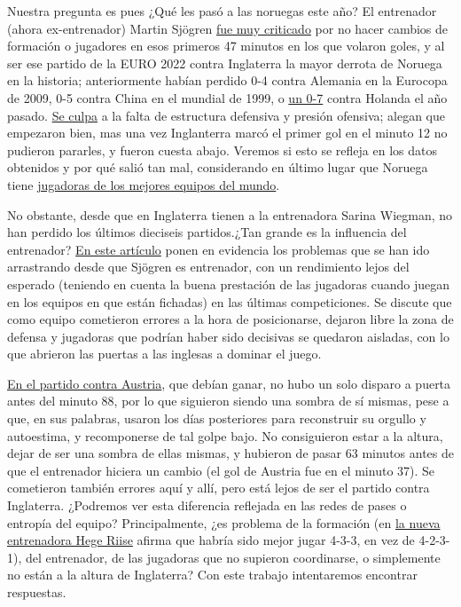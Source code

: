 Nuestra pregunta es pues ¿Qué les pasó a las noruegas este año? El entrenador (ahora ex-entrenador) Martin Sjögren 
\href{https://www.nrk.no/sport/massiv-kritikk-mot-sjogren-etter-tidenes-storste-norge-tap-1.16034807}{fue muy 
criticado} por no hacer cambios de formación o jugadores en esos primeros 47 minutos en los que volaron goles, 
y al ser ese partido de la EURO 2022 contra Inglaterra la mayor derrota de Noruega en la historia; anteriormente 
habían perdido 0-4 contra Alemania en la Eurocopa de 2009, 0-5 contra China en el mundial de 1999, o 
\href{https://www.nrk.no/sport/norges-landslag-knust-av-nederland--1.15538927}{un 0-7} contra Holanda el año pasado.
\href{https://www.nrk.no/sport/norge-mareritt-mot-england-i-em_-_-dette-er-direkte-pinlig-1.16034607}{Se culpa} a la 
falta de estructura defensiva y presión ofensiva; alegan que empezaron bien, mas una vez Inglanterra marcó el primer gol en 
el minuto 12 no pudieron pararles, y fueron cuesta abajo. Veremos si esto se refleja en los datos obtenidos y por qué 
salió tan mal, considerando en último lugar que Noruega tiene 
\href{https://www.nrk.no/sport/engelsk-forbauselse_-_-jeg-kan-ikke-helt-tro-det-jeg-nettopp-har-vaert-vitne-til-1.16034919}{
jugadoras de los mejores equipos del mundo}. 

No obstante, desde que en Inglaterra tienen a la entrenadora Sarina Wiegman, no 
han perdido los últimos dieciseis partidos.¿Tan grande es la influencia del entrenador? 
\href{https://www.nrk.no/sport/hvis-det-er-en-plan_-er-den-usynlig-1.16038718}{En este artículo} ponen en evidencia los problemas 
que se han ido arrastrando desde que Sjögren es entrenador, con un rendimiento lejos del esperado (teniendo en 
cuenta la buena prestación de las jugadoras cuando juegan en los equipos en que están fichadas) en las últimas 
competiciones. Se discute que como equipo cometieron errores a la hora de posicionarse, dejaron libre la zona de 
defensa y jugadoras que podrían haber sido decisivas se quedaron aisladas, con lo que abrieron las puertas a 
las inglesas a dominar el juego. 

\href{https://www.nrk.no/sport/norsk-fiasko-i-em_-_-en-varslet-katastrofe-1.16039578}{En el partido contra Austria},
que debían ganar, no hubo un solo disparo a puerta antes del minuto 88, por lo que siguieron siendo una sombra de sí 
mismas, pese a que, en sus palabras, usaron los días posteriores para reconstruir su orgullo y autoestima, y recomponerse 
de tal golpe bajo. No consiguieron estar a la altura, dejar de ser una sombra de ellas mismas, y hubieron de pasar 
63 minutos antes de que el entrenador hiciera un cambio (el gol de Austria fue en el minuto 37). Se cometieron también 
errores aquí y allí, pero está lejos de ser el partido contra Inglaterra. ¿Podremos ver esta diferencia reflejada 
en las redes de pases o entropía del equipo? Principalmente, ¿es problema de la formación 
(en \href{https://www.nrk.no/sport/reiten-ut-mot-sjogren-grep_-_-pa-tide-med-noko-nytt-1.16085631}{la nueva 
entrenadora Hege Riise} afirma que habría sido mejor jugar 4-3-3, en vez de 4-2-3-1), del entrenador, de las 
jugadoras que no supieron coordinarse, o simplemente no están a la altura de Inglaterra? Con este trabajo intentaremos 
encontrar respuestas.

